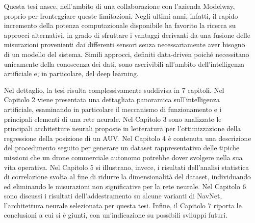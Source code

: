 Questa tesi nasce, nell'ambito di una collaborazione con l'azienda Modelway, proprio per fronteggiare queste limitazioni. Negli ultimi anni, infatti, il rapido incremento della potenza computazionale disponibile ha favorito la ricerca su approcci alternativi, in grado di sfruttare i vantaggi derivanti da una fusione delle misurazioni provenienti dai differenti sensori senza necessariamente aver bisogno di un modello del sistema. Simili approcci, definiti data-driven poiché necessitano unicamente della conoscenza dei dati, sono ascrivibili all'ambito dell'intelligenza artificiale e, in particolare, del deep learning. 

Nel dettaglio, la tesi risulta complessivamente suddivisa in 7 capitoli. Nel Capitolo 2 viene presentata una dettagliata panoramica sull'intelligenza artificiale, esaminando in particolare il meccanismo di funzionamento e i principali elementi di una rete neurale. Nel Capitolo 3 sono analizzate le principali architetture neurali proposte in letteratura per l'ottimizzazione della regressione della posizione di un AUV. Nel Capitolo 4 è contenuta una descrizione del procedimento seguito per generare un dataset rappresentativo delle tipiche missioni che un drone commerciale autonomo potrebbe dover svolgere nella sua vita operativa. Nel Capitolo 5 si illustrano, invece, i risultati dell'analisi statistica di correlazione svolta al fine di ridurre la dimensionalità del dataset, individuando ed eliminando le misurazioni non significative per la rete neurale. Nel Capitolo 6 sono discussi i risultati dell'addestramento su alcune varianti di NavNet, l'architettura neurale selezionata per questa tesi. Infine, il Capitolo 7 riporta le conclusioni a cui si è giunti, con un'indicazione su possibili sviluppi futuri.  